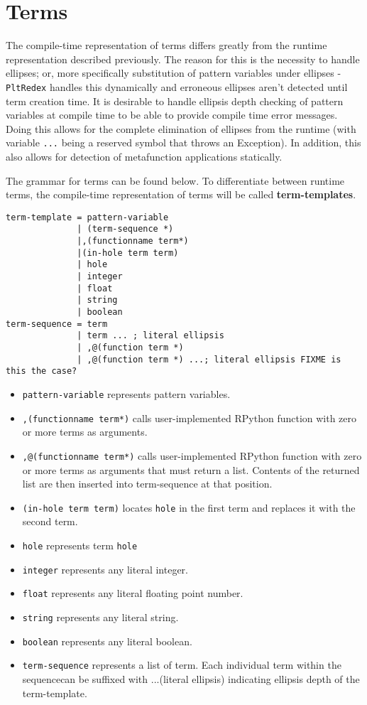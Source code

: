 \section{Terms}

The compile-time representation of terms differs greatly from the runtime representation described previously. The reason for this is the necessity to handle ellipses; or, more specifically substitution of pattern variables under ellipses - \texttt{PltRedex} handles this dynamically and erroneous ellipses aren't detected until term creation time.
It is desirable to handle ellipsis depth checking of pattern variables at compile time to be able to provide compile time error messages. Doing this allows for the complete elimination of ellipses from the runtime (with variable \texttt{...} being a reserved symbol that throws an Exception). In addition, this also allows for detection of metafunction applications statically.

The grammar for terms can be found below. To differentiate between runtime terms, the compile-time representation of terms will be called \textbf{term-templates}.

\begin{lstlisting}
term-template = pattern-variable 
              | (term-sequence *)
              |,(functionname term*) 
              |(in-hole term term)
              | hole
	          | integer
	          | float
	          | string
	          | boolean 
term-sequence = term
              | term ... ; literal ellipsis
              | ,@(function term *)
              | ,@(function term *) ...; literal ellipsis FIXME is this the case?
\end{lstlisting}

\begin{itemize}
\item 
\lstinline{pattern-variable} represents pattern variables.
\item
\lstinline{,(functionname term*)} calls user-implemented RPython function with zero or more terms as arguments.
\item
\lstinline{,@(functionname term*)} calls user-implemented RPython function with zero or more terms as arguments that must return a list. Contents of the returned list are then inserted into term-sequence at that position. 
\item
\lstinline{(in-hole term term)} locates \lstinline{hole} in the first term and replaces it with the second term.
\item
\lstinline{hole} represents term \lstinline{hole}
\item
\lstinline{integer} represents any literal integer.
\item
\lstinline{float} represents any literal floating point number.
\item
\lstinline{string}  represents any literal string.
\item
\lstinline{boolean}  represents any literal boolean.
\item
\lstinline{term-sequence} represents a list of term.  Each individual term within the sequencecan be suffixed with ...(literal ellipsis) indicating ellipsis depth of the term-template.
\end{itemize}

